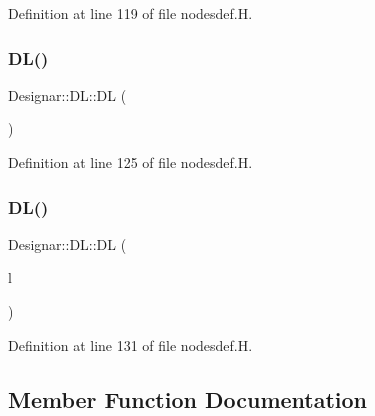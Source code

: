 Definition at line 119 of file nodesdef.\+H.

\mbox{\label{class_designar_1_1_d_l_a4caafdd81bc08bdb7d42cbcbe735f59f}} 
\subsubsection{\texorpdfstring{D\+L()}{DL()}\hspace{0.1cm}{\footnotesize\ttfamily [2/3]}}
{\footnotesize\ttfamily Designar\+::\+D\+L\+::\+DL (\begin{DoxyParamCaption}\item[{const \hyperlink{class_designar_1_1_d_l}{DL} \&}]{ }\end{DoxyParamCaption})\hspace{0.3cm}{\ttfamily [inline]}}



Definition at line 125 of file nodesdef.\+H.

\mbox{\label{class_designar_1_1_d_l_a4a9a38fbd77259a4af54dcd5017fce76}} 
\subsubsection{\texorpdfstring{D\+L()}{DL()}\hspace{0.1cm}{\footnotesize\ttfamily [3/3]}}
{\footnotesize\ttfamily Designar\+::\+D\+L\+::\+DL (\begin{DoxyParamCaption}\item[{\hyperlink{class_designar_1_1_d_l}{DL} \&\&}]{l }\end{DoxyParamCaption})\hspace{0.3cm}{\ttfamily [inline]}}



Definition at line 131 of file nodesdef.\+H.



\subsection{Member Function Documentation}
\mbox{\label{class_designar_1_1_d_l_a016ee38fa1d6a467f07b3c8838e14937}} 
